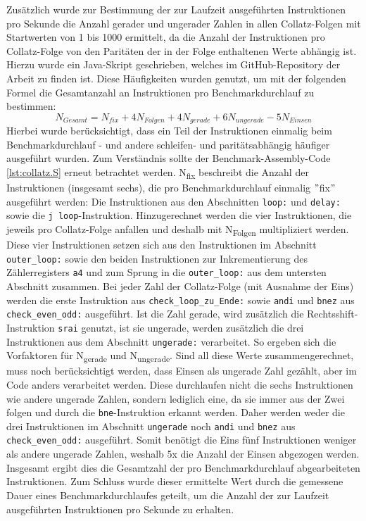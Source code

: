     Zusätzlich wurde zur Bestimmung der zur Laufzeit ausgeführten Instruktionen pro Sekunde die Anzahl gerader und ungerader Zahlen in allen Collatz-Folgen mit Startwerten von 1 bis 1000 ermittelt, da die Anzahl der Instruktionen pro Collatz-Folge von den Paritäten der in der Folge enthaltenen Werte abhängig ist.
    Hierzu wurde ein Java-Skript geschrieben, welches im GitHub-Repository der Arbeit \parencite{GitHub-Bachelorarbeit} zu finden ist.
    Diese Häufigkeiten wurden genutzt, um mit der folgenden Formel die Gesamtanzahl an Instruktionen pro Benchmarkdurchlauf zu bestimmen:
    \[
    N_{Gesamt} = N_{fix} + 4N_{Folgen} + 4N_{gerade} + 6N_{ungerade} - 5N_{Einsen}
    \]
    Hierbei wurde berücksichtigt, dass ein Teil der Instruktionen einmalig beim Benchmarkdurchlauf - und andere schleifen- und paritätsabhängig häufiger ausgeführt wurden.
    Zum Verständnis sollte der Benchmark-Assembly-Code \cref{lst:collatz.S} erneut betrachtet werden.
    N\textsubscript{fix} beschreibt die Anzahl der Instruktionen (insgesamt sechs), die pro Benchmarkdurchlauf einmalig \("\)fix\("\) ausgeführt werden: Die Instruktionen aus den Abschnitten \verb|loop:| und \verb|delay:| sowie die \verb|j loop|-Instruktion.
    Hinzugerechnet werden die vier Instruktionen, die jeweils pro Collatz-Folge anfallen und deshalb mit N\textsubscript{Folgen} multipliziert werden.
    Diese vier Instruktionen setzen sich aus den Instruktionen im Abschnitt \verb|outer_loop:| sowie den beiden Instruktionen zur Inkrementierung des Zählerregisters \verb|a4| und zum Sprung in die \verb|outer_loop:| aus dem untersten Abschnitt zusammen.
    Bei jeder Zahl der Collatz-Folge (mit Ausnahme der Eins) werden die erste Instruktion aus \verb|check_loop_zu_Ende:| sowie \verb|andi| und \verb|bnez| aus \verb|check_even_odd:| ausgeführt.
    Ist die Zahl gerade, wird zusätzlich die Rechtsshift-Instruktion \verb|srai| genutzt, ist sie ungerade, werden zusätzlich die drei Instruktionen aus dem Abschnitt \verb|ungerade:| verarbeitet.
    So ergeben sich die Vorfaktoren für N\textsubscript{gerade} und N\textsubscript{ungerade}.
    Sind all diese Werte zusammengerechnet, muss noch berücksichtigt werden, dass Einsen als ungerade Zahl gezählt, aber im Code anders verarbeitet werden.
    Diese durchlaufen nicht die sechs Instruktionen wie andere ungerade Zahlen, sondern lediglich eine, da sie immer aus der Zwei folgen und durch die \verb|bne|-Instruktion erkannt werden.
    Daher werden weder die drei Instruktionen im Abschnitt \verb|ungerade| noch \verb|andi| und \verb|bnez| aus \verb|check_even_odd:| ausgeführt.
    Somit benötigt die Eins fünf Instruktionen weniger als andere ungerade Zahlen, weshalb 5x die Anzahl der Einsen abgezogen werden.
    Insgesamt ergibt dies die Gesamtzahl der pro Benchmarkdurchlauf abgearbeiteten Instruktionen.
    Zum Schluss wurde dieser ermittelte Wert durch die gemessene Dauer eines Benchmarkdurchlaufes geteilt, um die Anzahl der zur Laufzeit ausgeführten Instruktionen pro Sekunde zu erhalten.

